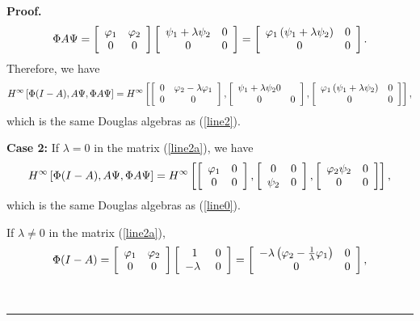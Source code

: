 \documentclass{article}%
\newenvironment{proof}[1][Proof]{\noindent\textbf{#1.} }{\ \rule{0.5em}{0.5em}}
\begin{document}
\begin{proof}
\begin{align}
\Phi A\Psi=\left[
\begin{array}
[c]{cc}%
\varphi_{1} & \varphi_{2}\\
0 & 0
\end{array}
\right]  \left[
\begin{array}
[c]{cc}%
\psi_{1}+\lambda\psi_{2} & 0\\
0 & 0
\end{array}
\right]  =\left[
\begin{array}
[c]{cc}%
\varphi_{1}\left(  \psi_{1}+\lambda\psi_{2}\right)  & 0\\
0 & 0
\end{array}
\right]  .\nonumber
\end{align}
Therefore, we have
\[
H^{\infty}\left[  \Phi(I-A),A\Psi,\Phi A\Psi\right]  =H^{\infty} \left[
\left[
\begin{array}
[c]{cc}%
0 & \varphi_{2}-\lambda\varphi_{1}\\
0 & 0
\end{array}
\right]  ,\left[
\begin{array}
[c]{cc}%
\psi_{1}+\lambda\psi_{2} 0 & \\
0 & 0
\end{array}
\right]  ,\left[
\begin{array}
[c]{cc}%
\varphi_{1}\left(  \psi_{1}+\lambda\psi_{2}\right)  & 0\\
0 & 0
\end{array}
\right]  \right]  ,
\]
which is the same Douglas algebras as (\ref{line2}).

\textbf{{Case 2:}} If $\lambda=0$ in the matrix (\ref{line2a}), we have
\[
H^{\infty}\left[  \Phi(I-A),A\Psi,\Phi A\Psi\right]  =H^{\infty} \left[
\left[
\begin{array}
[c]{cc}%
\varphi_{1} & 0\\
0 & 0
\end{array}
\right]  ,\left[
\begin{array}
[c]{cc}%
0 & 0\\
\psi_{2} & 0
\end{array}
\right]  ,\left[
\begin{array}
[c]{cc}%
\varphi_{2}\psi_{2} & 0\\
0 & 0
\end{array}
\right]  \right]  ,
\]
which is the same Douglas algebras as (\ref{line0}).

If $\lambda\neq0$ in the matrix (\ref{line2a}),
\begin{align}
\Phi(I-A)=\left[
\begin{array}
[c]{cc}%
\varphi_{1} & \varphi_{2}\\
0 & 0
\end{array}
\right]  \left[
\begin{array}
[c]{cc}%
1 & 0\\
-\lambda\  & 0
\end{array}
\right]  =\left[
\begin{array}
[c]{cc}%
-\lambda\left(  \varphi_{2}-\frac{1}{\lambda}\varphi_{1}\right)  & 0\\
0 & 0
\end{array}
\right]  ,\nonumber
\end{align}
%


\end{proof}
\end{document}
